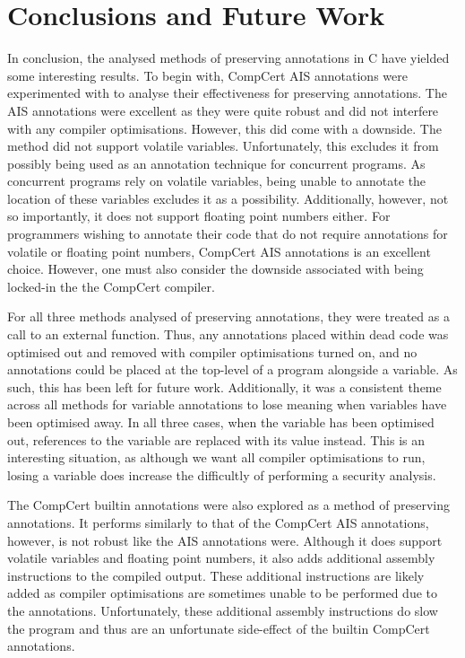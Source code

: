 \chapter{Conclusions and Future Work}
In conclusion, the analysed methods of preserving annotations in C have yielded some interesting results. To begin with, CompCert AIS annotations were experimented with to analyse their effectiveness for preserving annotations. The AIS annotations were excellent as they were quite robust and did not interfere with any compiler optimisations. However, this did come with a downside. The method did not support volatile variables. Unfortunately, this excludes it from possibly being used as an annotation technique for concurrent programs. As concurrent programs rely on volatile variables, being unable to annotate the location of these variables excludes it as a possibility. Additionally, however, not so importantly, it does not support floating point numbers either. For programmers wishing to annotate their code that do not require annotations for volatile or floating point numbers, CompCert AIS annotations is an excellent choice. However, one must also consider the downside associated with being locked-in the the CompCert compiler.  

For all three methods analysed of preserving annotations, they were treated as a call to an external function. Thus, any annotations placed within dead code was optimised out and removed with compiler optimisations turned on, and no annotations could be placed at the top-level of a program alongside a variable. As such, this has been left for future work. Additionally, it was a consistent theme across all methods for variable annotations to lose meaning when variables have been optimised away. In all three cases, when the variable has been optimised out, references to the variable are replaced with its value instead. This is an interesting situation, as although we want all compiler optimisations to run, losing a variable does increase the difficultly of performing a security analysis. 

The CompCert builtin annotations were also explored as a method of preserving annotations. It performs similarly to that of the CompCert AIS annotations, however, is not robust like the AIS annotations were. Although it does support volatile variables and floating point numbers, it also adds additional assembly instructions to the compiled output. These additional instructions are likely added as compiler optimisations are sometimes unable to be performed due to the annotations. Unfortunately, these additional assembly instructions do slow the program and thus are an unfortunate side-effect of the builtin CompCert annotations. 

